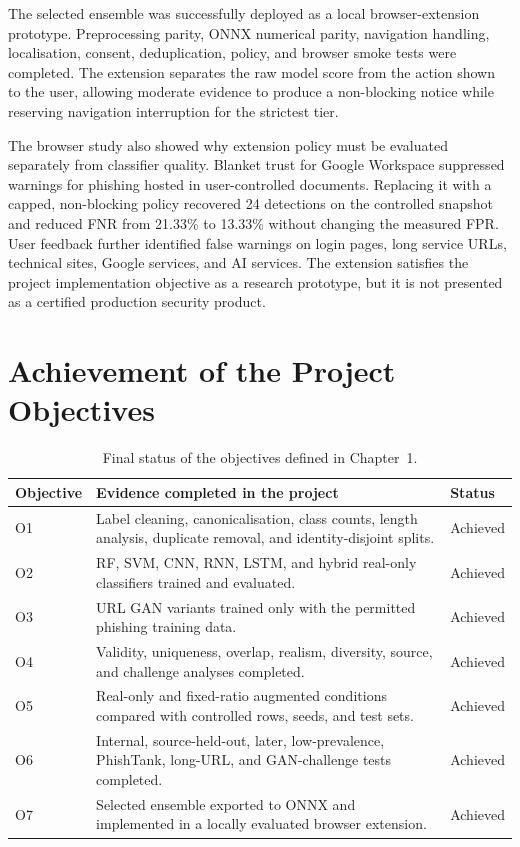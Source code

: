 The selected ensemble was successfully deployed as a local browser-extension
prototype. Preprocessing parity, ONNX numerical parity, navigation handling,
localisation, consent, deduplication, policy, and browser smoke tests were
completed. The extension separates the raw model score from the action shown
to the user, allowing moderate evidence to produce a non-blocking notice while
reserving navigation interruption for the strictest tier.

The browser study also showed why extension policy must be evaluated separately
from classifier quality. Blanket trust for Google Workspace suppressed warnings
for phishing hosted in user-controlled documents. Replacing it with a capped,
non-blocking policy recovered 24 detections on the controlled snapshot and
reduced FNR from 21.33\% to 13.33\% without changing the measured FPR. User
feedback further identified false warnings on login pages, long service URLs,
technical sites, Google services, and AI services. The extension satisfies the
project implementation objective as a research prototype, but it is not
presented as a certified production security product.

\section{Achievement of the Project Objectives}

\begin{table}[htbp]
\centering
\caption{Final status of the objectives defined in Chapter~1.}
\label{tab:conclusion-objectives}
\small
\begin{tabular}{@{}p{}p{}p{}@{}}
\toprule
Objective & Evidence completed in the project & Status \\
\midrule
O1 & Label cleaning, canonicalisation, class counts, length analysis, duplicate removal, and identity-disjoint splits. & Achieved \\
O2 & RF, SVM, CNN, RNN, LSTM, and hybrid real-only classifiers trained and evaluated. & Achieved \\
O3 & URL GAN variants trained only with the permitted phishing training data. & Achieved \\
O4 & Validity, uniqueness, overlap, realism, diversity, source, and challenge analyses completed. & Achieved \\
O5 & Real-only and fixed-ratio augmented conditions compared with controlled rows, seeds, and test sets. & Achieved \\
O6 & Internal, source-held-out, later, low-prevalence, PhishTank, long-URL, and GAN-challenge tests completed. & Achieved \\
O7 & Selected ensemble exported to ONNX and implemented in a locally evaluated browser extension. & Achieved \\
\bottomrule
\end{tabular}
\end{table}

